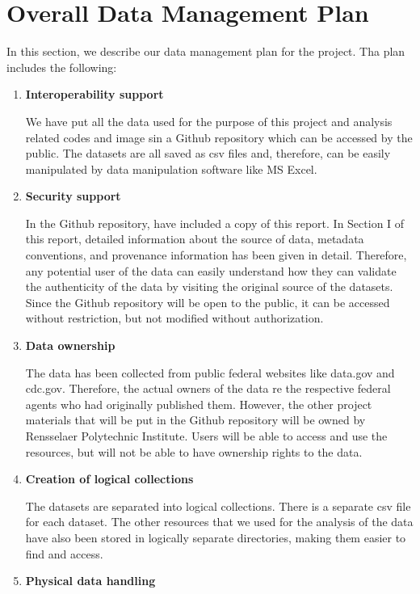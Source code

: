 \documentclass[journal,12pt,onecolumn]{IEEEtran}
\begin{document}
\section{Overall Data Management Plan}
In this section, we describe our data management plan for the project.
Tha plan includes the following:
\begin{enumerate}
\item \textbf{Interoperability support}


We have put all the data used for the purpose of this project and analysis related codes and image sin a Github repository which can be accessed by the public.
The datasets are all saved as csv files and, therefore, can be easily manipulated by data manipulation software like MS Excel.

\item \textbf{Security support}


In the Github repository, have included a copy of this report.
In Section I of this report, detailed information about the source of data, metadata conventions, and provenance information has been given in detail.
Therefore, any potential user of the data can easily understand how they can validate the authenticity of the data by visiting the original source of the datasets.
Since the Github repository will be open to the public, it can be accessed without restriction, but not modified without authorization.

\item \textbf{Data ownership}


The data has been collected from public federal websites like data.gov and cdc.gov. 
Therefore, the actual owners of the data re the respective federal agents who had originally published them.
However, the other project materials that will be put in the Github repository will be owned by Rensselaer Polytechnic Institute.
Users will be able to access and use the resources, but will not be able to have ownership rights to the data.


\item \textbf{Creation of logical collections}

The datasets are separated into logical collections.
There is a separate csv file for each dataset.
The other resources that we used for the analysis of the data have also been stored in logically separate directories, making them easier to find and access.


\item \textbf{Physical data handling}



\end{enumerate}
\end{document}
